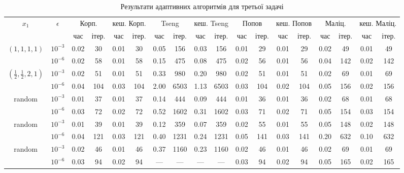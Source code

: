 \begin{table}[H]
    \centering
    \begin{tabular}{||c|c||c|c|c|c||c|c|c|c||c|c|c|c||c|c|c|c||} \hline \hline
        \multirow{2}{*}{$x_1$} & \multirow{2}{*}{$\epsilon$} & \multicolumn{2}{c|}{Корп.} & \multicolumn{2}{c||}{кеш. Корп.} & \multicolumn{2}{c|}{Tseng} & \multicolumn{2}{c||}{кеш. Tseng} & \multicolumn{2}{c|}{Попов} & \multicolumn{2}{c||}{кеш. Попов} & \multicolumn{2}{c|}{Маліц.} & \multicolumn{2}{c||}{кеш. Маліц.} \\ \cline{3-18}
        & & час & ітер. & час & ітер. & час & ітер. & час & ітер. & час & ітер. & час & ітер. & час & ітер. & час & ітер. \\ \hline \hline
        \multirow{2}{*}{$(1, 1, 1, 1)$} & $10^{-3}$ & 0.02 & 30 & 0.01 & 30 & 0.05 & 156 & 0.03 & 156 & 0.01 & 29 & 0.01 & 29 & 0.02 & 49 & 0.01 & 49 \\ \cline{2-18}
        & $10^{-6}$ & 0.02 & 58 & 0.01 & 58 & 0.15 & 475 & 0.08 & 475 & 0.02 & 56 & 0.01 & 56 & 0.04 & 142 & 0.02 & 142 \\ \hline
        \multirow{2}{*}{$(\frac{1}{2}, \frac{1}{2}, 2, 1)$} & $10^{-3}$ & 0.02 & 51 & 0.01 & 51 & 0.33 & 980 & 0.20 & 980 & 0.02 & 51 & 0.01 & 51 & 0.02 & 69 & 0.01 & 69 \\ \cline{2-18}
        & $10^{-6}$ & 0.04 & 104 & 0.03 & 104 & 2.00 & 6503 & 1.13 & 6503 & 0.03 & 104 & 0.02 & 104 & 0.05 & 156 & 0.02 & 156 \\ \hline
        \multirow{2}{*}{random} & $10^{-3}$ & 0.01 & 37 & 0.01 & 37 & 0.14 & 444 & 0.09 & 444 & 0.01 & 36 & 0.01 & 36 & 0.02 & 68 & 0.01 & 68 \\ \cline{2-18}
        & $10^{-6}$ & 0.03 & 72 & 0.02 & 72 & 0.52 & 1602 & 0.31 & 1602 & 0.03 & 71 & 0.02 & 71 & 0.05 & 154 & 0.03 & 154 \\ \hline
        \multirow{2}{*}{random} & $10^{-3}$ & 0.01 & 39 & 0.01 & 39 & 0.12 & 359 & 0.07 & 359 & 0.02 & 55 & 0.01 & 55 & 0.05 & 148 & 0.02 & 148 \\ \cline{2-18}
        & $10^{-6}$ & 0.04 & 121 & 0.03 & 121 & 0.40 & 1231 & 0.24 & 1231 & 0.05 & 141 & 0.03 & 141 & 0.20 & 632 & 0.10 & 632 \\ \hline
        \multirow{2}{*}{random} & $10^{-3}$ & 0.02 & 46 & 0.01 & 46 & 0.37 & 1160 & 0.23 & 1160 & 0.02 & 46 & 0.01 & 46 & 0.02 & 69 & 0.01 & 69 \\ \cline{2-18}
        & $10^{-6}$ & 0.03 & 94 & 0.02 & 94 & --- & --- & --- & --- & 0.03 & 94 & 0.02 & 94 & 0.05 & 165 & 0.02 & 165 \\ \hline    
        \hline
    \end{tabular}
    \caption{Результати адаптивних алгоритмів для третьої задачі}
    \label{tab:3-adapt}
\end{table}
